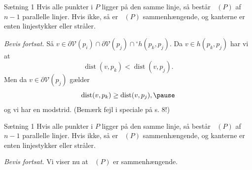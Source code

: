 \documentclass{beamer} %
\DeclareMathOperator{\dist}{dist}
\DeclareMathOperator{\VorG}{Vor_{G}}
\begin{document}
\begin{frame}
\begin{block}{Sætning 1}
Hvis alle punkter i $P$ ligger på den samme linje, så består $\VorG(P)$ af $n - 1$ parallelle linjer.
Hvis ikke, så er $\VorG(P)$ sammenhængende, og kanterne er enten linjestykker eller stråler.
\end{block}
\textit{Bevis fortsat.} \pause Så $v \in \partial \mathcal{V}(p_i) \cap \partial \mathcal{V}(p_j) \cap {}^{\circ}h(p_k, p_j)$. \pause Da $v \in h(p_k, p_j)$ har vi at
\[
	\dist(v, p_k) < \dist(v, p_j).
\]
\pause Men da $v \in \partial \mathcal{V}(p_j)$ gælder
\[
	\dist(v, p_k) \geq \dist(v, p_j), \pause
\]
og vi har en modstrid. \pause (Bemærk fejl i speciale på s. 8!)
\end{frame}

\begin{frame}
\begin{block}{Sætning 1}
Hvis alle punkter i $P$ ligger på den samme linje, så består $\VorG(P)$ af $n - 1$ parallelle linjer.
Hvis ikke, så er $\VorG(P)$ sammenhængende, og kanterne er enten linjestykker eller stråler.
\end{block}
\textit{Bevis fortsat.} \pause Vi viser nu at $\VorG(P)$ er sammenhængende.
\end{frame}
\end{document}
